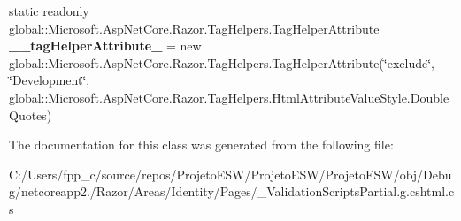 \begin{DoxyCompactItemize}
\item 
\mbox{\label{class_projeto_e_s_w_1_1_areas_1_1_identity_1_1_pages_1_1_areas___identity___pages_____validation_scripts_partial_a17d1b6e10a5c504d6929f1e928471972}} 
static readonly global\+::\+Microsoft.\+Asp\+Net\+Core.\+Razor.\+Tag\+Helpers.\+Tag\+Helper\+Attribute {\bfseries \+\_\+\+\_\+tag\+Helper\+Attribute\+\_} = new global\+::\+Microsoft.\+Asp\+Net\+Core.\+Razor.\+Tag\+Helpers.\+Tag\+Helper\+Attribute(\char`\"{}exclude\char`\"{}, \char`\"{}Development\char`\"{}, global\+::\+Microsoft.\+Asp\+Net\+Core.\+Razor.\+Tag\+Helpers.\+Html\+Attribute\+Value\+Style.\+Double\+Quotes)
\end{DoxyCompactItemize}


The documentation for this class was generated from the following file\+:\begin{DoxyCompactItemize}
\item 
C\+:/\+Users/fpp\+\_\+c/source/repos/\+Projeto\+E\+S\+W/\+Projeto\+E\+S\+W/\+Projeto\+E\+S\+W/obj/\+Debug/netcoreapp2./\+Razor/\+Areas/\+Identity/\+Pages/\+\_\+\+Validation\+Scripts\+Partial.\+g.\+cshtml.\+cs\end{DoxyCompactItemize}
